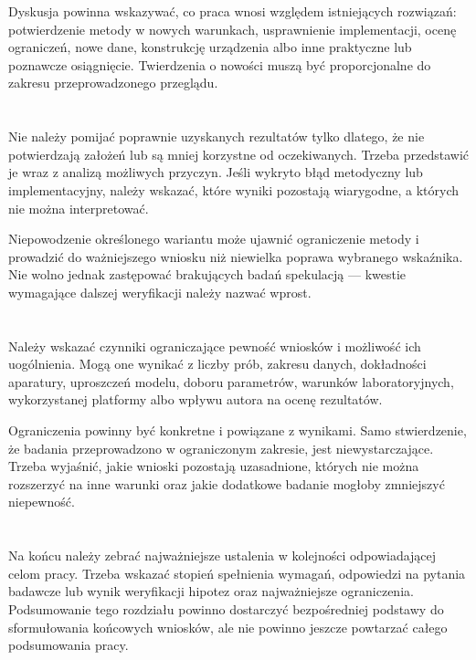 Dyskusja powinna wskazywać, co praca wnosi względem istniejących rozwiązań: potwierdzenie metody w nowych warunkach, usprawnienie implementacji, ocenę ograniczeń, nowe dane, konstrukcję urządzenia albo inne praktyczne lub poznawcze osiągnięcie. Twierdzenia o nowości muszą być proporcjonalne do zakresu przeprowadzonego przeglądu.

\section{}

Nie należy pomijać poprawnie uzyskanych rezultatów tylko dlatego, że nie potwierdzają założeń lub są mniej korzystne od oczekiwanych. Trzeba przedstawić je wraz z analizą możliwych przyczyn. Jeśli wykryto błąd metodyczny lub implementacyjny, należy wskazać, które wyniki pozostają wiarygodne, a których nie można interpretować.

Niepowodzenie określonego wariantu może ujawnić ograniczenie metody i prowadzić do ważniejszego wniosku niż niewielka poprawa wybranego wskaźnika. Nie wolno jednak zastępować brakujących badań spekulacją — kwestie wymagające dalszej weryfikacji należy nazwać wprost.

\section{}

Należy wskazać czynniki ograniczające pewność wniosków i możliwość ich uogólnienia. Mogą one wynikać z liczby prób, zakresu danych, dokładności aparatury, uproszczeń modelu, doboru parametrów, warunków laboratoryjnych, wykorzystanej platformy albo wpływu autora na ocenę rezultatów.

Ograniczenia powinny być konkretne i powiązane z wynikami. Samo stwierdzenie, że badania przeprowadzono w ograniczonym zakresie, jest niewystarczające. Trzeba wyjaśnić, jakie wnioski pozostają uzasadnione, których nie można rozszerzyć na inne warunki oraz jakie dodatkowe badanie mogłoby zmniejszyć niepewność.

\section{}

Na końcu należy zebrać najważniejsze ustalenia w kolejności odpowiadającej celom pracy. Trzeba wskazać stopień spełnienia wymagań, odpowiedzi na pytania badawcze lub wynik weryfikacji hipotez oraz najważniejsze ograniczenia. Podsumowanie tego rozdziału powinno dostarczyć bezpośredniej podstawy do sformułowania końcowych wniosków, ale nie powinno jeszcze powtarzać całego podsumowania pracy.
